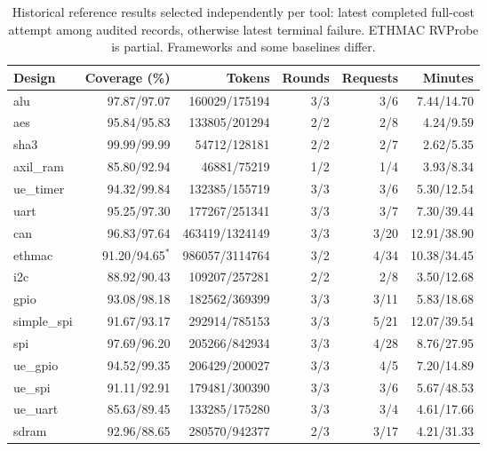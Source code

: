 \begin{table}[t]
\centering\small
\caption{Historical reference results selected independently per tool: latest completed full-cost attempt among audited records, otherwise latest terminal failure. ETHMAC RVProbe is partial. Frameworks and some baselines differ.}
\begin{tabular}{lrrrrr}
\hline
Design & Coverage (\%) & Tokens & Rounds & Requests & Minutes \\
\hline
alu & 97.87/97.07 & 160029/175194 & 3/3 & 3/6 & 7.44/14.70 \\
aes & 95.84/95.83 & 133805/201294 & 2/2 & 2/8 & 4.24/9.59 \\
sha3 & 99.99/99.99 & 54712/128181 & 2/2 & 2/7 & 2.62/5.35 \\
axil\_ram & 85.80/92.94 & 46881/75219 & 1/2 & 1/4 & 3.93/8.34 \\
ue\_timer & 94.32/99.84 & 132385/155719 & 3/3 & 3/6 & 5.30/12.54 \\
uart & 95.25/97.30 & 177267/251341 & 3/3 & 3/7 & 7.30/39.44 \\
can & 96.83/97.64 & 463419/1324149 & 3/3 & 3/20 & 12.91/38.90 \\
ethmac & 91.20/94.65$^*$ & 986057/3114764 & 3/2 & 4/34 & 10.38/34.45 \\
i2c & 88.92/90.43 & 109207/257281 & 2/2 & 2/8 & 3.50/12.68 \\
gpio & 93.08/98.18 & 182562/369399 & 3/3 & 3/11 & 5.83/18.68 \\
simple\_spi & 91.67/93.17 & 292914/785153 & 3/3 & 5/21 & 12.07/39.54 \\
spi & 97.69/96.20 & 205266/842934 & 3/3 & 4/28 & 8.76/27.95 \\
ue\_gpio & 94.52/99.35 & 206429/200027 & 3/3 & 4/5 & 7.20/14.89 \\
ue\_spi & 91.11/92.91 & 179481/300390 & 3/3 & 3/6 & 5.67/48.53 \\
ue\_uart & 85.63/89.45 & 133285/175280 & 3/3 & 3/4 & 4.61/17.66 \\
sdram & 92.96/88.65 & 280570/942377 & 2/3 & 3/17 & 4.21/31.33 \\
\hline
\end{tabular}
\end{table}
